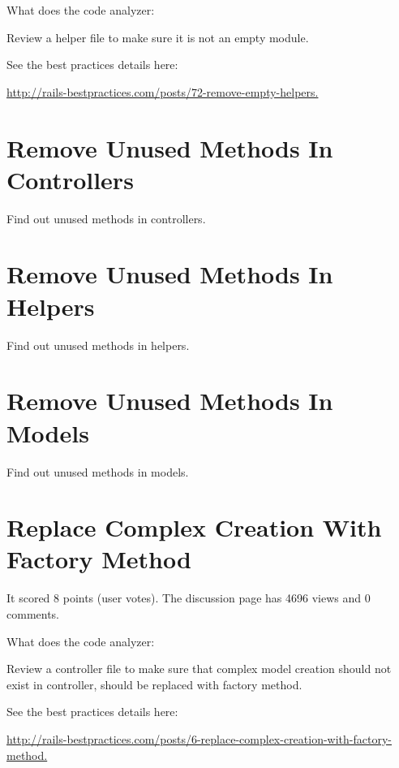 What does the code analyzer:

Review a helper file to make sure it is not an empty module.

See the best practices details here:
 
\url{http://rails-bestpractices.com/posts/72-remove-empty-helpers.}

\section{Remove Unused Methods In Controllers}


  Find out unused methods in controllers.
   
\section{Remove Unused Methods In Helpers}
  Find out unused methods in helpers.
       
\section{Remove Unused Methods In Models}
  Find out unused methods in models.

\section{Replace Complex Creation With Factory Method}


It scored 8 points (user votes). 
The discussion page has 4696 views and 0 comments.

What does the code analyzer:

Review a controller file to make sure that complex model creation should not exist in controller, should be replaced with factory method.

See the best practices details here:
 
\url{http://rails-bestpractices.com/posts/6-replace-complex-creation-with-factory-method.}


